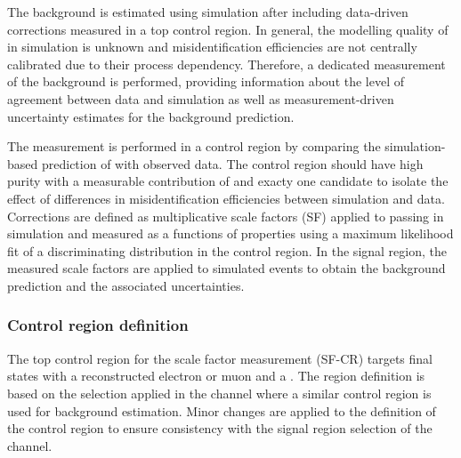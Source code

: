 The \ttbarFakes background is estimated using simulation after
including data-driven corrections measured in a top control
region. In general, the modelling quality of \faketauhadvis in
simulation is unknown and \jettotauhadvis misidentification
efficiencies are not centrally calibrated due to their process
dependency. Therefore, a dedicated measurement of the \ttbarFakes
background is performed, providing information about the level of
agreement between data and simulation as well as measurement-driven
uncertainty estimates for the background prediction.

The measurement is performed in a control region by comparing the
simulation-based prediction of \ttbarFakes with observed data. The
control region should have high \ttbar purity with a measurable
contribution of \ttbarFakes and exacty one \tauhadvis candidate to
isolate the effect of differences in misidentification efficiencies
between simulation and data. Corrections are defined as multiplicative
scale factors (SF) applied to \faketauhadvis passing \tauid in
simulation and measured as a functions of \faketauhadvis properties
using a maximum likelihood fit of a discriminating distribution in the
control region.  In the \hadhad signal region, the measured scale
factors are applied to simulated \ttbarFakes events to obtain the
background prediction and the associated uncertainties.


\subsubsection{Control region definition}

The top control region for the scale factor measurement (SF-CR)
targets final states with a reconstructed electron or muon and a
\tauhadvis. The region definition is based on the selection applied in
the \lephad channel where a similar control region is used for
\faketauhadvis background estimation. Minor changes are applied to the
definition of the control region to ensure consistency with the signal
region selection of the \hadhad channel.

